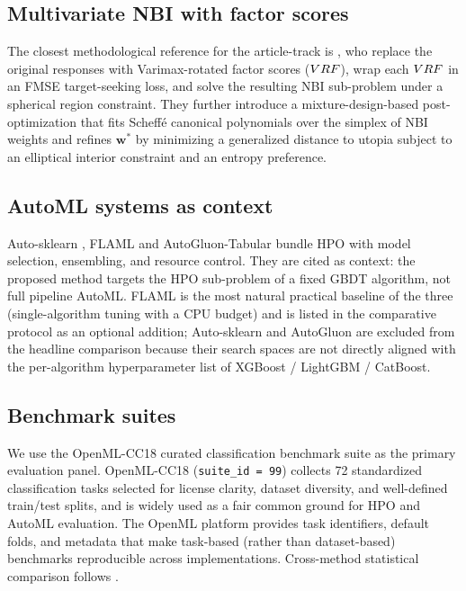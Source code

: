 \subsection{Multivariate NBI with factor
scores}\label{sec:rw-pereira}
The closest methodological reference for the article-track is
\citet{pereira2025eaai}, who replace the original responses with
Varimax-rotated factor scores ($VRF$), wrap each $VRF$ in an FMSE
target-seeking loss, and solve the resulting NBI sub-problem under a
spherical region constraint. They further introduce a
mixture-design-based post-optimization that fits Scheff\'{e}
canonical polynomials over the simplex of NBI weights and refines
$\bm w^{*}$ by minimizing a generalized distance to utopia subject to
an elliptical interior constraint and an entropy preference.

\subsection{AutoML systems as context}\label{sec:rw-automl}
Auto-sklearn \citep{feurer2015autosklearn}, FLAML
\citep{wang2021flaml} and AutoGluon-Tabular
\citep{erickson2020autogluon} bundle HPO with model selection,
ensembling, and resource control. They are cited as context: the
proposed method targets the HPO sub-problem of a fixed GBDT
algorithm, not full pipeline AutoML. FLAML is the most natural
practical baseline of the three (single-algorithm tuning with a CPU
budget) and is listed in the comparative protocol as an optional
addition; Auto-sklearn and AutoGluon are excluded from the headline
comparison because their search spaces are not directly aligned with
the per-algorithm hyperparameter list of XGBoost / LightGBM /
CatBoost.

\subsection{Benchmark suites}\label{sec:rw-benchmarks}
We use the OpenML-CC18 curated classification benchmark suite
\citep{bischl2021openmlbenchmark} as the primary evaluation panel.
OpenML-CC18 (\texttt{suite\_id = 99}) collects 72 standardized
classification tasks selected for license clarity, dataset diversity,
and well-defined train/test splits, and is widely used as a fair
common ground for HPO and AutoML evaluation. The OpenML platform
\citep{vanschoren2014openml} provides task identifiers, default folds,
and metadata that make task-based (rather than dataset-based)
benchmarks reproducible across implementations. Cross-method
statistical comparison follows \citet{demsar2006statistical}.

